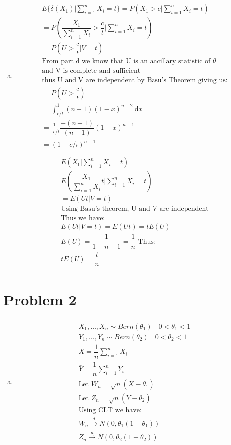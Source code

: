 \documentclass{article}
\newcommand{\dx}{\mathrm{d}x}
\newcommand{\cd}{\overset{d}{\to}}
\begin{document}
\begin{flushleft}
\begin{enumerate}[(a)]
	\item 
\begin{multline*}\\
E\{\delta(X_1)|\sum_{i=1}^{n}X_i=t \}=P(X_1>c|\sum_{i=1}^{n}X_i=t )\\
=P\left(\dfrac{X_1}{\sum_{i=1}^{n}X_i}>\dfrac{c}{t}|\sum_{i=1}^{n}X_i=t \right)\\
=P\left(U>\dfrac{c}{t}|V=t\right)\\
\text{From part d we know that U is an ancillary statistic of } \theta\\
\text{and V is complete and sufficient}\\
\text{thus U and V are independent by Basu's Theorem giving us:}\\
=P\left(U>\dfrac{c}{t}\right)\\
=\int_{c/t}^{1}(n-1)(1-x)^{n-2} \ \dx\\
=\bigg|_{c/t}^{1}\dfrac{-(n-1)}{(n-1)}(1-x)^{n-1}\\
=(1-c/t)^{n-1}\\
\end{multline*}
\begin{multline*}\\
E(X_1|\sum_{i=1}^{n}X_i=t)\\
E\left(\dfrac{X_1}{\sum_{i=1}^{n}X_i}t|\sum_{i=1}^{n}X_i=t\right)\\
=E(Ut|V=t)\\
\text{Using Basu's theorem, U and V are independent}\\
\text{Thus we have:}\\
E(Ut|V=t)=E(Ut)=tE(U)\\
E(U)=\dfrac{1}{1+n-1}=\dfrac{1}{n} \text{ Thus:}\\
tE(U)=\dfrac{t}{n}\\
\end{multline*}
\end{enumerate}

	\section*{Problem 2}
\begin{enumerate}[(a)]
	
	\item 
\begin{multline*}\\
X_1,\dots, X_n \sim Bern(\theta_1) \quad 0<\theta_1<1\\
Y_1,\dots, Y_n \sim Bern(\theta_2) \quad 0<\theta_2<1\\
\bar{X}=\dfrac{1}{n}\sum_{i=1}^{n}X_i\\
\bar{Y}=\dfrac{1}{n}\sum_{i=1}^{n}Y_i\\
\text{Let } W_n=\sqrt{n}(\bar{X}-\theta_1)\\
\text{Let } Z_n=\sqrt{n}(\bar{Y}-\theta_2)\\
\text{Using CLT we have:}\\
W_n\cd N(0,\theta_1(1-\theta_1))\\
Z_n \cd N(0,\theta_2(1-\theta_2))\\
\end{multline*}


\end{enumerate}
\end{flushleft}
\end{document}
